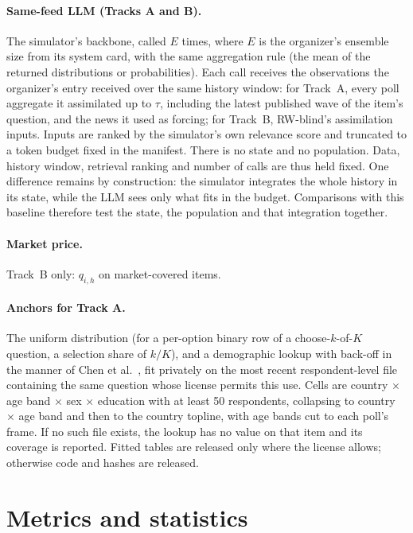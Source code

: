 \documentclass[11pt]{article}
\begin{document}
\paragraph{Same-feed LLM (Tracks A and B).} The simulator's backbone, called $E$ times, where $E$ is the organizer's ensemble size from its system card, with the same aggregation rule (the mean of the returned distributions or probabilities). Each call receives the observations the organizer's entry received over the same history window: for Track~A, every poll aggregate it assimilated up to $\tau$, including the latest published wave of the item's question, and the news it used as forcing; for Track~B, RW-blind's assimilation inputs. Inputs are ranked by the simulator's own relevance score and truncated to a token budget fixed in the manifest. There is no state and no population. Data, history window, retrieval ranking and number of calls are thus held fixed. One difference remains by construction: the simulator integrates the whole history in its state, while the LLM sees only what fits in the budget. Comparisons with this baseline therefore test the state, the population and that integration together.

\paragraph{Market price.} Track~B only: $q_{i,h}$ on market-covered items.

\paragraph{Anchors for Track A.} The uniform distribution (for a per-option binary row of a choose-$k$-of-$K$ question, a selection share of $k/K$), and a demographic lookup with back-off in the manner of Chen et al.\ \citep{chen2026synthetic}, fit privately on the most recent respondent-level file containing the same question whose license permits this use. Cells are country $\times$ age band $\times$ sex $\times$ education with at least 50 respondents, collapsing to country $\times$ age band and then to the country topline, with age bands cut to each poll's frame. If no such file exists, the lookup has no value on that item and its coverage is reported. Fitted tables are released only where the license allows; otherwise code and hashes are released.

\section{Metrics and statistics}
\end{document}
